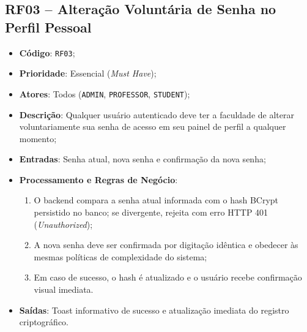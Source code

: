 \subsection{RF03 -- Alteração Voluntária de Senha no Perfil Pessoal}
\begin{itemize}
    \item \textbf{Código}: \texttt{RF03};
    \item \textbf{Prioridade}: Essencial (\textit{Must Have});
    \item \textbf{Atores}: Todos (\texttt{ADMIN}, \texttt{PROFESSOR}, \texttt{STUDENT});
    \item \textbf{Descrição}: Qualquer usuário autenticado deve ter a faculdade de alterar voluntariamente sua senha de acesso em seu painel de perfil a qualquer momento;
    \item \textbf{Entradas}: Senha atual, nova senha e confirmação da nova senha;
    \item \textbf{Processamento e Regras de Negócio}:
    \begin{enumerate}
        \item O backend compara a senha atual informada com o hash BCrypt persistido no banco; se divergente, rejeita com erro HTTP 401 (\textit{Unauthorized});
        \item A nova senha deve ser confirmada por digitação idêntica e obedecer às mesmas políticas de complexidade do sistema;
        \item Em caso de sucesso, o hash é atualizado e o usuário recebe confirmação visual imediata.
    \end{enumerate}
    \item \textbf{Saídas}: Toast informativo de sucesso e atualização imediata do registro criptográfico.
\end{itemize}

